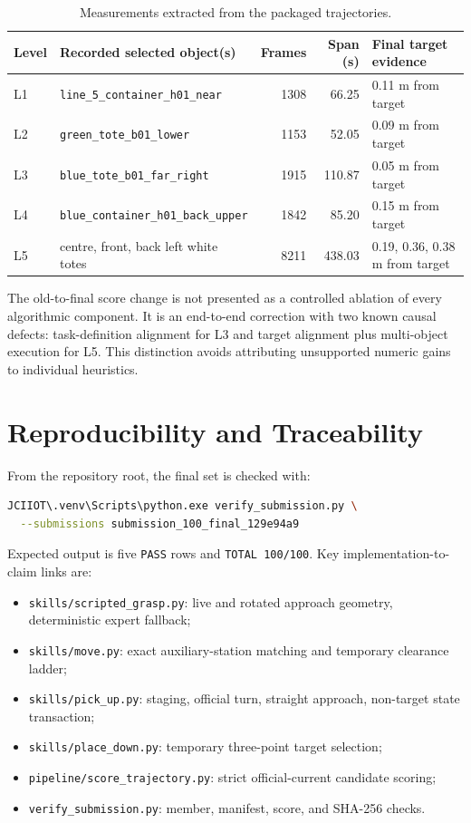 \documentclass[11pt,a4paper]{article}
\begin{document}
\begin{table}[H]
\centering
\small
\begin{tabularx}{\textwidth}{l X r r X}
\toprule
\textbf{Level} & \textbf{Recorded selected object(s)} & \textbf{Frames} & \textbf{Span (s)} & \textbf{Final target evidence} \\
\midrule
L1 & \texttt{line\_5\_container\_h01\_near} & 1308 & 66.25 & 0.11 m from target \\
L2 & \texttt{green\_tote\_b01\_lower} & 1153 & 52.05 & 0.09 m from target \\
L3 & \texttt{blue\_tote\_b01\_far\_right} & 1915 & 110.87 & 0.05 m from target \\
L4 & \texttt{blue\_container\_h01\_back\_upper} & 1842 & 85.20 & 0.15 m from target \\
L5 & centre, front, back left white totes & 8211 & 438.03 & 0.19, 0.36, 0.38 m from target \\
\bottomrule
\end{tabularx}
\caption{Measurements extracted from the packaged trajectories.}
\label{tab:trajectory}
\end{table}

The old-to-final score change is not presented as a controlled ablation of every algorithmic component. It is an end-to-end correction with two known causal defects: task-definition alignment for L3 and target alignment plus multi-object execution for L5. This distinction avoids attributing unsupported numeric gains to individual heuristics.

\section{Reproducibility and Traceability}

From the repository root, the final set is checked with:

\begin{lstlisting}[language=bash,caption={Deterministic verification command.}]
JCIIOT\.venv\Scripts\python.exe verify_submission.py \
  --submissions submission_100_final_129e94a9
\end{lstlisting}

Expected output is five \texttt{PASS} rows and \texttt{TOTAL 100/100}. Key implementation-to-claim links are:

\begin{itemize}
\item \texttt{skills/scripted\_grasp.py}: live and rotated approach geometry, deterministic expert fallback;
\item \texttt{skills/move.py}: exact auxiliary-station matching and temporary clearance ladder;
\item \texttt{skills/pick\_up.py}: staging, official turn, straight approach, non-target state transaction;
\item \texttt{skills/place\_down.py}: temporary three-point target selection;
\item \texttt{pipeline/score\_trajectory.py}: strict official-current candidate scoring;
\item \texttt{verify\_submission.py}: member, manifest, score, and SHA-256 checks.
\end{itemize}
\end{document}
